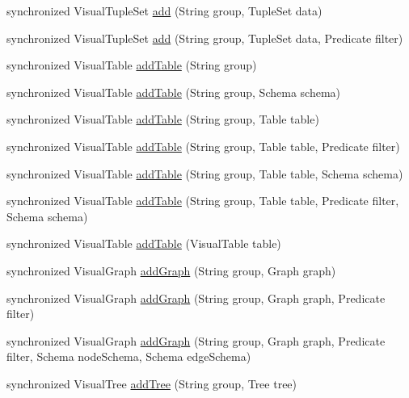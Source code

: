 \begin{DoxyCompactItemize}
\item 
synchronized \-Visual\-Tuple\-Set \hyperlink{classprefuse_1_1_visualization_ab79414b5d699750a30741cb66c2bde97}{add} (\-String group, \-Tuple\-Set data)
\item 
synchronized \-Visual\-Tuple\-Set \hyperlink{classprefuse_1_1_visualization_a81101b7130165e854a73a1a9a1b39418}{add} (\-String group, \-Tuple\-Set data, \-Predicate filter)
\item 
synchronized \-Visual\-Table \hyperlink{classprefuse_1_1_visualization_a80111fdd15baef4780b2bb705f8257b4}{add\-Table} (\-String group)
\item 
synchronized \-Visual\-Table \hyperlink{classprefuse_1_1_visualization_a1b0dc235131518ba08ffd49449278340}{add\-Table} (\-String group, \-Schema schema)
\item 
synchronized \-Visual\-Table \hyperlink{classprefuse_1_1_visualization_a8a5343e5374bde224c17d9b42772e485}{add\-Table} (\-String group, \-Table table)
\item 
synchronized \-Visual\-Table \hyperlink{classprefuse_1_1_visualization_abd61486dfa7fd9d7d8c5114fe4ef266e}{add\-Table} (\-String group, \-Table table, \-Predicate filter)
\item 
synchronized \-Visual\-Table \hyperlink{classprefuse_1_1_visualization_a0834a30c3b482814de790f166c4e1f58}{add\-Table} (\-String group, \-Table table, \-Schema schema)
\item 
synchronized \-Visual\-Table \hyperlink{classprefuse_1_1_visualization_ad0fb873f3220ff01d130401cc803ab4f}{add\-Table} (\-String group, \-Table table, \-Predicate filter, \-Schema schema)
\item 
synchronized \-Visual\-Table \hyperlink{classprefuse_1_1_visualization_a6d712fb2bfc3fe2b34b7c491e3da050e}{add\-Table} (\-Visual\-Table table)
\item 
synchronized \-Visual\-Graph \hyperlink{classprefuse_1_1_visualization_ad683162b64622b5b27cf525d66e423f5}{add\-Graph} (\-String group, \-Graph graph)
\item 
synchronized \-Visual\-Graph \hyperlink{classprefuse_1_1_visualization_a3137d7ddfb512f7434c555ad4834525d}{add\-Graph} (\-String group, \-Graph graph, \-Predicate filter)
\item 
synchronized \-Visual\-Graph \hyperlink{classprefuse_1_1_visualization_a36e7aeedafd8fd34ab140152275424b0}{add\-Graph} (\-String group, \-Graph graph, \-Predicate filter, \-Schema node\-Schema, \-Schema edge\-Schema)
\item 
synchronized \-Visual\-Tree \hyperlink{classprefuse_1_1_visualization_acf625891c06a99db4c87fa4c886b048a}{add\-Tree} (\-String group, \-Tree tree)

\end{DoxyCompactItemize}
